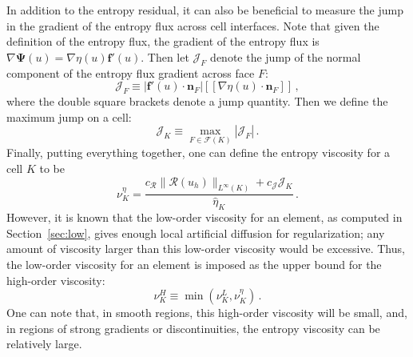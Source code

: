 \documentclass[xchauthor,chkrefs,fixeqskip,GCNS,amsmath,amsthm]{yjcphg}
\theoremstyle{remark}
\newcommand{\Lbrack}{[\![}
\newcommand{\Rbrack}{]\!]}
\begin{document}
In addition to the entropy residual, it can also be beneficial to
measure the jump in the gradient of the entropy flux across cell
interfaces. Note that given the definition of the entropy flux, the
gradient of the entropy flux is $\nabla\bm{\Psi}(u)=\nabla
\eta(u)\mathbf{f}'(u)$. Then let $\mathcal{J}_{F}$ denote the jump of
the normal component of the entropy flux gradient across face $F$:
%
\begin{equation}
\mathcal{J}_{F} \equiv|\mathbf{f}'(u)\cdot\mathbf{n}_{F}|
\Lbrack
\nabla\eta(u)\cdot\mathbf{n}_{F}\Rbrack \,,
\end{equation}
%
where the double square brackets denote a jump quantity. Then we define
the maximum jump on a cell:
%
\begin{equation}
\mathcal{J}_{K} \equiv\max\limits_{F\in\mathcal{F}(K)} |\mathcal{J}
_{F}| \,.
\end{equation}
%
Finally, putting everything together, one can define the entropy
viscosity for a cell $K$ to be
%
\begin{equation}
\nu^{\eta}_{K} = \frac{c_{\mathcal{R}}\|\mathcal{R}(u_{h})\|_{L^{
\infty}(K)}
+ c_{\mathcal{J}}\mathcal{J}_{K}}{\hat{\eta}_{K}}
\,.
\end{equation}
%
However, it is known that the low-order viscosity for an element, as
computed in Section~\ref{sec:low}, gives enough local artificial
diffusion for regularization; any amount of viscosity larger than this
low-order viscosity would be excessive. Thus, the low-order viscosity
for an element is imposed as the upper bound for the high-order
viscosity:
%
\begin{equation}
\nu^{H}_{K} \equiv\min(\nu^{L}_{K}, \nu^{\eta}_{K}) \,.
\end{equation}
%
One can note that, in smooth regions, this high-order viscosity will be
small, and, in regions of strong gradients or discontinuities, the
entropy viscosity can be relatively large.
\end{document}
